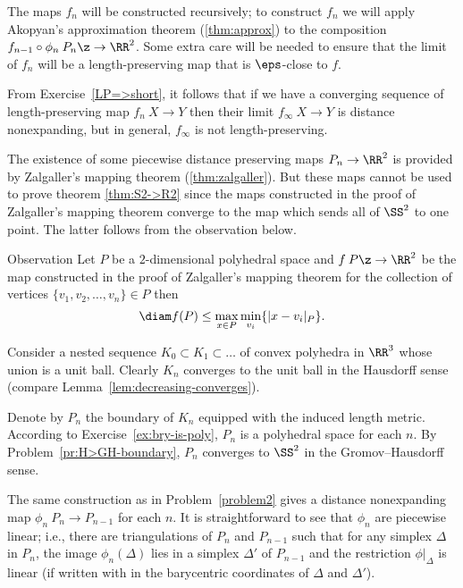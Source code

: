 The maps $f_n$ will be constructed recursively;
to construct $f_n$
we will apply Akopyan's approximation theorem (\ref{thm:approx}) to the composition $f_{n-1}\circ\phi_n\:P_n\z\to\RR^2$.
Some extra care will be needed to ensure that the limit of $f_n$  will be a length-preserving map that is $\eps$-close to $f$.



From Exercise~\ref{LP=>short},
it follows that if we have a converging sequence of  length-preserving map $f_n\:X\to Y$ then their limit $f_\infty\:X\to Y$ is distance nonexpanding,
but in general, $f_\infty$ is not  length-preserving.

The existence of some piecewise distance preserving maps $P_n\to\RR^2$ is provided by Zalgaller's mapping theorem (\ref{thm:zalgaller}).
But these maps cannot be used to prove theorem \ref{thm:S2->R2}
since the maps constructed in the proof of Zalgaller's mapping theorem converge to the map which sends all of $\SS^2$ to one point.
The latter follows from the observation below.


\begin{thm}{Observation}
Let $P$ be a $2$-dimensional polyhedral space and $f\:P\z\to\RR^2$ be the map constructed in the proof of Zalgaller's mapping theorem for the collection of vertices $\{v_1,v_2,\dots,v_n\}\in P$ then 
$$\diam f(P)\le\max_{x\in P}\min_{v_i}\{|x-v_i|_P\}.$$

\end{thm}


Consider a nested
sequence $K_0\subset K_1\subset \dots$ of convex polyhedra in $\RR^3$ whose union is a unit ball.
Clearly $K_n$ converges to the unit ball in the Hausdorff sense (compare Lemma~\ref{lem:decreasing-converges}).

Denote by $P_n$ the boundary of $K_n$ equipped with the induced length metric. %
According to Exercise~\ref{ex:bry-is-poly}, $P_n$ is a polyhedral space for each $n$.
By Problem~\ref{pr:H>GH-boundary}, $P_n$ converges to $\SS^2$ in the Gromov--Hausdorff sense.

The same construction as in Problem~\ref{problem2} 
gives a distance nonexpanding map $\phi_n\:P_n\to P_{n-1}$ for each $n$.
It is straightforward to see that $\phi_n$ are piecewise linear;
i.e., there are triangulations of $P_n$ and $P_{n-1}$ such that for any simplex $\Delta$ in $P_n$, the image $\phi_n(\Delta)$ lies in a simplex $\Delta'$ of $P_{n-1}$ and the restriction $\phi |_\Delta$ is linear (if written with in the barycentric coordinates of $\Delta$ and $\Delta'$). 


